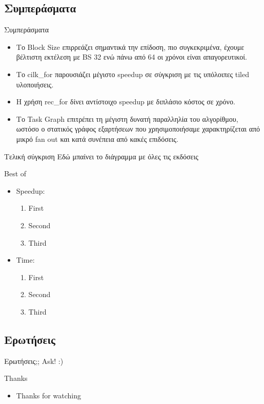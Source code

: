\documentclass{beamer}
\begin{document}
\subsection{Συμπεράσματα}
\begin{frame}{Συμπεράσματα}
    \begin{itemize}
            \item<1-> Το Block Size επιρρεάζει σημαντικά την επίδοση, πιο
                συγκεκριμένα, έχουμε βέλτιστη εκτέλεση με BS 32 ενώ πάνω από
                64 οι χρόνοι είναι απαγορευτικοί.
            \item<2-> Το cilk\_for παρουσιάζει μέγιστο speedup σε σύγκριση με
                τις υπόλοιπες tiled υλοποιήσεις.
            \item<3-> Η χρήση rec\_for δίνει αντίστοιχο speedup με διπλάσιο
                κόστος σε χρόνο.
            \item<4-> Το Task Graph επιτρέπει τη μέγιστη δυνατή παραλληλία του
                αλγορίθμου, ωστόσο ο στατικός γράφος εξαρτήσεων που
                χρησιμοποιήσαμε χαρακτηρίζεται από μικρό fan out και κατά
                συνέπεια από κακές επιδόσεις.
    \end{itemize}
\end{frame}

\begin{frame}{Τελική σύγκριση}
    Εδώ μπαίνει το διάγραμμα με όλες τις εκδόσεις
\end{frame}

\begin{frame}
    \begin{block}{Best of}
    \begin{itemize}
        \item<1-> Speedup:
            \begin{enumerate}
                \item<2-> First
                \item<3-> Second
                \item<4-> Third
            \end{enumerate}
        \item<5-> Time:
            \begin{enumerate}
                \item<6-> First
                \item<7-> Second
                \item<8-> Third
            \end{enumerate}
    \end{itemize}
    \end{block}
\end{frame}


\subsection{Ερωτήσεις}
\begin{frame}{Ερωτήσεις;;}
    Ask! :)
\end{frame}

\begin{frame}{Thanks}
    \begin{itemize}
        \item Thanks for watching
    \end{itemize}
\end{frame}
\end{document}
